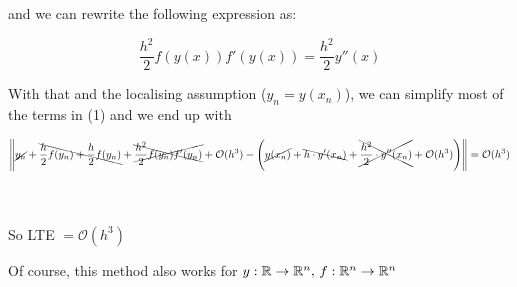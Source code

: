 and we can rewrite the following expression as:

\[
  \frac{h^2}{2}f(y(x))f'(y(x)) = \frac{h^2}{2}y''(x)
\]

With that and the localising assumption ($y_n = y(x_n)$), we can simplify most of the terms in (1) and we end up with

\small

\[
  \left\lVert\cancel{y_n} + \bcancel{\frac{h}{2}f(y_n) + \frac{h}{2}f(y_n)} + \xcancel{\frac{h^2}{2}f(y_n)f'(y_n)} + \mathcal{O}(h^3)  - \left(\cancel{y(x_n)} + \bcancel{h\cdot y'(x_n)} + \xcancel{\frac{h^2}{2}\cdot y''(x_n)} + \mathcal{O}(h^3) \right)\right\rVert = \mathcal{O}(h^3)
\]

\normalsize
\-\\\\
So LTE $= \mathcal{O}(h^3)$\\

\begin{remark}
  Of course, this method also works for $y: \mathbb{R} \to \mathbb{R}^n, \, f:\mathbb{R}^n \to \mathbb{R}^n$
\end{remark}